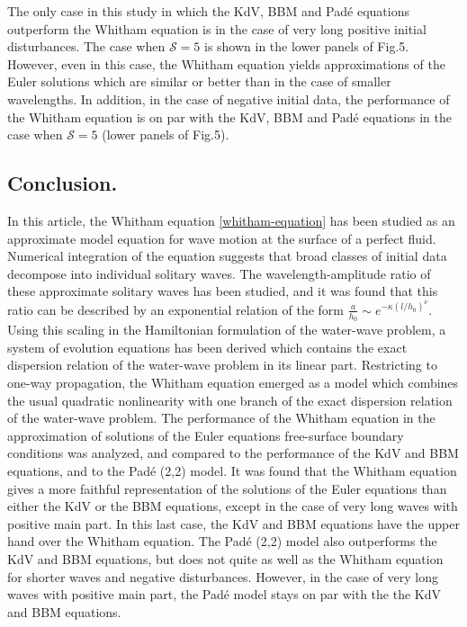 The only case in this study in which the KdV, BBM and Pad\'e equations outperform
the Whitham equation is in the case of very long positive initial disturbances.
The case when $\mathcal{S} = 5$ is shown in the lower panels of Fig.5. 
However, even in this case, the Whitham equation yields approximations of the
Euler solutions which are similar or better than in the case of smaller wavelengths.
In addition, in the case of negative initial data, the performance
of the Whitham equation is on par with the KdV, BBM and Pad\'e equations 
in the case when $\mathcal{S} = 5$ (lower panels of Fig.5).

%
%
\subsection{Conclusion.}
%
In this article, the Whitham equation \eqref{whitham-equation}
has been studied as an approximate model equation for wave motion
at the surface of a perfect fluid. Numerical integration of the
equation suggests that broad classes of initial data decompose
into individual solitary waves. The wavelength-amplitude ratio
of these approximate solitary waves has been studied, and it 
was found that this ratio can be described by an exponential
relation of the form
$\frac{a}{h_0} \sim e^{-\kappa(l/h_0)^\nu}$.
Using this scaling in the Hamiltonian formulation of the water-wave problem,
a system of evolution equations has been derived which contains the exact
dispersion relation of the water-wave problem in its linear part.
Restricting to one-way propagation, the Whitham equation emerged
as a model which combines the usual quadratic nonlinearity 
with one branch of the exact dispersion relation of the water-wave problem.
The performance of the Whitham equation in the approximation of
solutions of the Euler equations free-surface boundary conditions
was analyzed, and compared to the performance of the KdV and BBM equations,
and to the Pad\'e (2,2) model.
It was found that the Whitham equation gives a more faithful representation 
of the solutions of the Euler equations than either the KdV or the BBM equations, 
except in the case of very long waves with positive main part. In this last case,
the KdV and BBM equations have the upper hand over the Whitham equation.
The Pad\'e (2,2) model also outperforms the KdV and BBM equations,
but does not quite as well as the Whitham equation for shorter waves and negative
disturbances. However, in the case of very long waves with positive main part,
the Pad\'e model stays on par with the the KdV and BBM equations.
